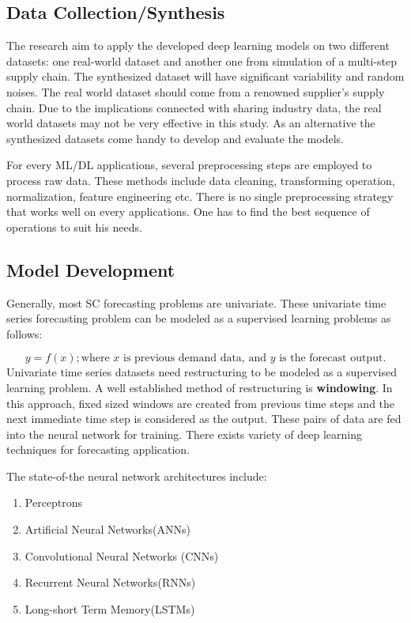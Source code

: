 \subsection{Data Collection/Synthesis}
The research aim to apply the developed deep learning models on two different datasets: one real-world dataset and another one from simulation of a multi-step supply chain. The synthesized dataset will have significant variability and random noises. The real world dataset should come from a renowned supplier's supply chain. 
Due to the implications connected with sharing industry data, the real world datasets may not be very effective in this study. As an alternative the synthesized datasets come handy to develop and evaluate the models.

For every ML/DL applications, several preprocessing steps are employed to process raw data. These methods include data cleaning, transforming operation, normalization, feature engineering etc. There is no single preprocessing strategy that works well on every applications. One has to find the best sequence of operations to suit his needs\cite{kotsiantis2006data}. 


\subsection{Model Development}

Generally, most SC forecasting problems are univariate. These univariate time series forecasting problem can be modeled as a supervised learning problems as follows:

$$ y = f(x); \text{where $x$ is previous demand data, and $y$ is the forecast output.} $$
Univariate time series datasets need restructuring to be modeled as a supervised learning problem. A well established method of restructuring is \textbf{windowing}. In this approach, fixed sized windows are created from previous time steps and the next immediate time step is considered as the output. These pairs of data are fed into the neural network for training. There exists variety of deep learning techniques for forecasting application. 

\noindent The state-of-the neural network architectures include:
\begin{enumerate}
    \item{Perceptrons}
    \item{Artificial Neural Networks(ANNs)}
    \item{Convolutional Neural Networks (CNNs)}
    \item{Recurrent Neural Networks(RNNs)}
    \item{Long-short Term Memory(LSTMs)}
\end{enumerate}

